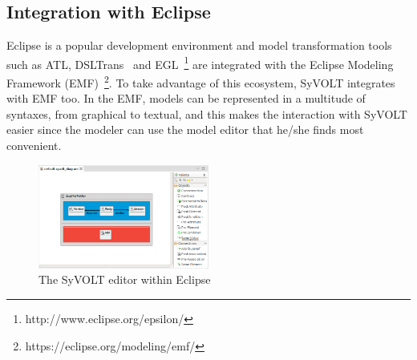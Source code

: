 \subsection{Integration with Eclipse}

Eclipse is a popular development environment and model transformation
tools such as ATL, DSLTrans~\cite{Barroca2011} and
EGL~\footnote{http://www.eclipse.org/epsilon/} are integrated with the Eclipse Modeling Framework
(EMF)~\footnote{https://eclipse.org/modeling/emf/}. To take advantage of this
ecosystem, SyVOLT integrates with EMF too. In the EMF, models can be represented in a multitude of syntaxes, from
graphical to textual, and this makes the interaction with SyVOLT easier since the modeler
can use the model editor that he/she finds most convenient.



\begin{figure}
\centering
\includegraphics[width=0.5\textwidth]{figures/eclipse_frontend}
\caption{The SyVOLT editor within Eclipse}
\label{fig:eclipse_frontend}
\end{figure}




 